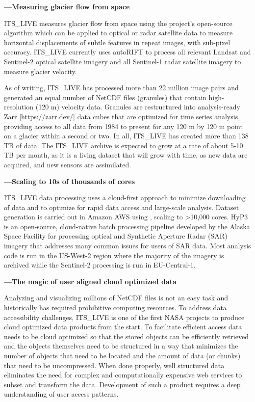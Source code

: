 \documentclass[
  super,
  preprint,
  3p,
  twocolumn]{elsarticle}
\begin{document}
\textbf{---Measuring glacier flow from space}

ITS\_LIVE measures glacier flow from space using the project's
open-source \citep[autoRIFT][]{Lei2021-nu, Gardner2018-eu} algorithm
which can be applied to optical or radar satellite data to measure
horizontal displacements of subtle features in repeat images, with
sub-pixel accuracy. ITS\_LIVE currently uses autoRIFT to process all
relevant Landsat and Sentinel-2 optical satellite imagery and all
Sentinel-1 radar satellite imagery to measure glacier velocity.

As of writing, ITS\_LIVE has processed more than 22 million image pairs
and generated an equal number of NetCDF files (granules) that contain
high-resolution (120 m) velocity data. Granules are restructured into
analysis-ready Zarr {[}https://zarr.dev/{]} data cubes that are
optimized for time series analysis, providing access to all data from
1984 to present for any 120 m by 120 m point on a glacier within a
second or two. In all, ITS\_LIVE has created more than 138 TB of data.
The ITS\_LIVE archive is expected to grow at a rate of about 5-10 TB per
month, as it is a living dataset that will grow with time, as new data
are acquired, and new sensors are assimilated.

\textbf{---Scaling to 10s of thousands of cores}

ITS\_LIVE data processing uses a cloud-first approach to minimize
downloading of data and to optimize for rapid data access and
large-scale analysis. Dataset generation is carried out in Amazon AWS
using \citep[HyP3][]{Hogenson2023-cj} , scaling to \textgreater10,000
cores. HyP3 is an open-source, cloud-native batch processing pipeline
developed by the Alaska Space Facility for processing optical and
Synthetic Aperture Radar (SAR) imagery that addresses many common issues
for users of SAR data. Most analysis code is run in the US-West-2 region
where the majority of the imagery is archived while the Sentinel-2
processing is run in EU-Central-1.

\textbf{---The magic of user aligned cloud optimized data}

Analyzing and visualizing millions of NetCDF files is not an easy task
and historically has required prohibitive computing resources. To
address data accessibility challenges, ITS\_LIVE is one of the first
NASA projects to produce cloud optimized data products from the start.
To facilitate efficient access data needs to be cloud optimized so that
the stored objects can be efficiently retrieved and the objects
themselves need to be structured in a way that minimizes the number of
objects that need to be located and the amount of data (or chunks) that
need to be uncompressed. When done properly, well structured data
eliminates the need for complex and computationally expensive web
services to subset and transform the data. Development of such a product
requires a deep understanding of user access patterns.
\end{document}
